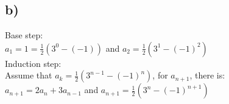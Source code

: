 \documentclass{article}
\begin{document}
    \subsection*{b)}
        Base step:\\
        \(a_1=1=\frac{1}{2} (3^0-(-1))\) and \(a_2=\frac{1}{2} (3^1-(-1)^2)\)\\
        Induction step:\\
        Assume that \(a_k=\frac{1}{2}(3^{n-1}-(-1)^n)\), for \(a_{n+1}\), there is:\\
            \(a_{n+1}=2a_n+3a_{n-1}\) and \(a_{n+1}=\frac{1}{2}(3^{n}-(-1)^{n+1})\)
\end{document}
